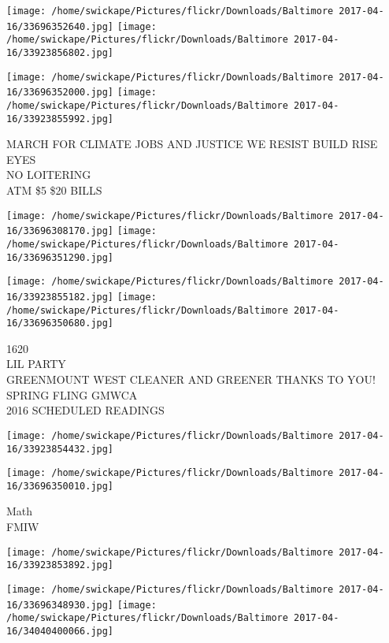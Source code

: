 \documentclass[10pt,letterpaper]{article}
\begin{document}
\texttt{[image: /home/swickape/Pictures/flickr/Downloads/Baltimore 2017-04-16/33696352640.jpg]}
\texttt{[image: /home/swickape/Pictures/flickr/Downloads/Baltimore 2017-04-16/33923856802.jpg]}

\texttt{[image: /home/swickape/Pictures/flickr/Downloads/Baltimore 2017-04-16/33696352000.jpg]}
\texttt{[image: /home/swickape/Pictures/flickr/Downloads/Baltimore 2017-04-16/33923855992.jpg]}

MARCH FOR CLIMATE JOBS AND JUSTICE WE RESIST BUILD RISE\\
EYES\\
NO LOITERING\\
ATM \$5 \$20 BILLS\\
\pagebreak

\texttt{[image: /home/swickape/Pictures/flickr/Downloads/Baltimore 2017-04-16/33696308170.jpg]}
\texttt{[image: /home/swickape/Pictures/flickr/Downloads/Baltimore 2017-04-16/33696351290.jpg]}

\texttt{[image: /home/swickape/Pictures/flickr/Downloads/Baltimore 2017-04-16/33923855182.jpg]}
\texttt{[image: /home/swickape/Pictures/flickr/Downloads/Baltimore 2017-04-16/33696350680.jpg]}

1620\\
LIL PARTY\\
GREENMOUNT WEST CLEANER AND GREENER THANKS TO YOU!  SPRING FLING GMWCA\\
2016 SCHEDULED READINGS\\
\pagebreak

\texttt{[image: /home/swickape/Pictures/flickr/Downloads/Baltimore 2017-04-16/33923854432.jpg]}

\vspace{0.25in}
\texttt{[image: /home/swickape/Pictures/flickr/Downloads/Baltimore 2017-04-16/33696350010.jpg]}

Math\\
FMIW\\
\pagebreak

\texttt{[image: /home/swickape/Pictures/flickr/Downloads/Baltimore 2017-04-16/33923853892.jpg]}

\vspace{0.25in}
\texttt{[image: /home/swickape/Pictures/flickr/Downloads/Baltimore 2017-04-16/33696348930.jpg]}
\texttt{[image: /home/swickape/Pictures/flickr/Downloads/Baltimore 2017-04-16/34040400066.jpg]}
\end{document}
